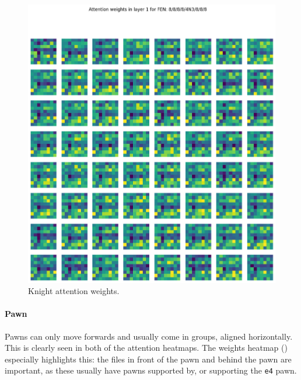 \begin{figure}[H]
\begin{minipage}{0.475\textwidth}
    \includegraphics[width=\textwidth]{project/img/attention_maps/N_weights_1.png}
    \caption{Knight attention weights.}
    \label{atnN1}
  \end{minipage}
\end{figure}

\paragraph{Pawn} Pawns can only move forwards and usually come in groups,
aligned horizontally. This is clearly seen in both of the attention heatmaps.
The weights heatmap () especially highlights this: the files in
front of the pawn and behind the pawn are important, as these usually have
pawns supported by, or supporting the \texttt{e4} pawn.

